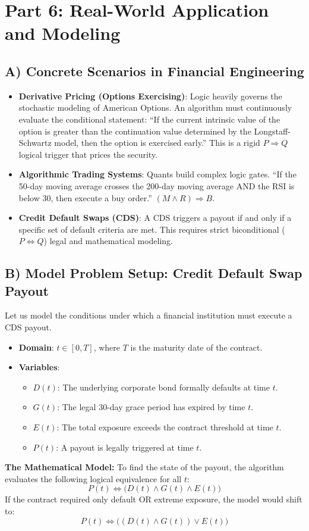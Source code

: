 \documentclass[11pt]{article}
\begin{document}
\newpage
\section{Part 6: Real-World Application and Modeling}

\subsection{A) Concrete Scenarios in Financial Engineering}
\begin{itemize}
    \item \textbf{Derivative Pricing (Options Exercising)}: Logic heavily governs the stochastic modeling of American Options. An algorithm must continuously evaluate the conditional statement: ``If the current intrinsic value of the option is greater than the continuation value determined by the Longstaff-Schwartz model, then the option is exercised early.'' This is a rigid $P \Rightarrow Q$ logical trigger that prices the security.
    \item \textbf{Algorithmic Trading Systems}: Quants build complex logic gates. ``If the 50-day moving average crosses the 200-day moving average AND the RSI is below 30, then execute a buy order.'' $(M \wedge R) \Rightarrow B$.
    \item \textbf{Credit Default Swaps (CDS)}: A CDS triggers a payout if and only if a specific set of default criteria are met. This requires strict biconditional ($P \Leftrightarrow Q$) legal and mathematical modeling.
\end{itemize}

\subsection{B) Model Problem Setup: Credit Default Swap Payout}
Let us model the conditions under which a financial institution must execute a CDS payout.
\begin{itemize}
    \item \textbf{Domain}: $t \in [0, T]$, where $T$ is the maturity date of the contract.
    \item \textbf{Variables}:
    \begin{itemize}
        \item $D(t)$: The underlying corporate bond formally defaults at time $t$.
        \item $G(t)$: The legal 30-day grace period has expired by time $t$.
        \item $E(t)$: The total exposure exceeds the contract threshold at time $t$.
        \item $P(t)$: A payout is legally triggered at time $t$.
    \end{itemize}
\end{itemize}
\textbf{The Mathematical Model:}
To find the state of the payout, the algorithm evaluates the following logical equivalence for all $t$:
\[ P(t) \Leftrightarrow \Big( D(t) \wedge G(t) \wedge E(t) \Big) \]
If the contract required only default OR extreme exposure, the model would shift to:
\[ P(t) \Leftrightarrow \Big( (D(t) \wedge G(t)) \vee E(t) \Big) \]
\end{document}
